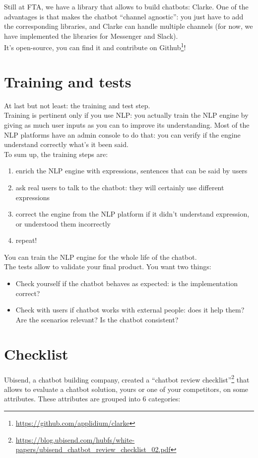 \documentclass{article}
\begin{document}
Still at FTA, we have a library that allows to build chatbots: Clarke. One of the advantages is that makes the chatbot “channel agnostic”: you just have to add the corresponding libraries, and Clarke can handle multiple channels (for now, we have implemented the libraries for Messenger and Slack).\\
It’s open-source, you can find it and contribute on Github\footnote{\url{https://github.com/applidium/clarke}}!

\section{Training and tests}
At last but not least: the training and test step.\\
Training is pertinent only if you use NLP: you actually train the NLP engine by giving as much user inputs as you can to improve its understanding. Most of the NLP platforms have an admin console to do that: you can verify if the engine understand correctly what’s it been said.\\
To sum up, the training steps are:
\begin{enumerate}
    \item enrich the NLP engine with expressions, sentences that can be said by users
    \item ask real users to talk to the chatbot: they will certainly use different expressions
    \item correct the engine from the NLP platform if it didn't understand expression, or understood them incorrectly
    \item repeat!
\end{enumerate}
You can train the NLP engine for the whole life of the chatbot.\\
\newpage
The tests allow to validate your final product. You want two things:
\begin{itemize}
    \item Check yourself if the chatbot behaves as expected: is the implementation correct?
    \item Check with users if chatbot works with external people: does it help them? Are the scenarios relevant? Is the chatbot consistent?
\end{itemize}

\section{Checklist}
Ubisend, a chatbot building company, created a “chatbot review checklist”\footnote{\url{https://blog.ubisend.com/hubfs/white-papers/ubisend_chatbot_review_checklist_02.pdf}} that allows to evaluate a chatbot solution, yours or one of your competitors, on some attributes. These attributes are grouped into 6 categories:
\end{document}
